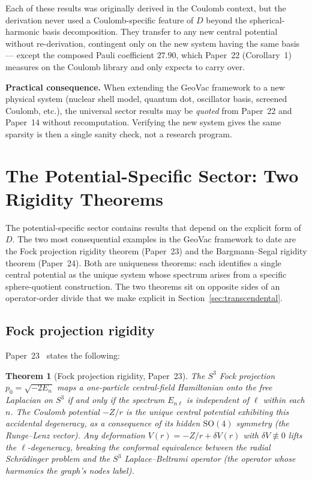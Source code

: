 \documentclass[twocolumn,pra,amsmath,amssymb,superscriptaddress]{revtex4-2}
\newtheorem{theorem}{Theorem}
\begin{document}
Each of these results was originally derived in the Coulomb context,
but the derivation never used a Coulomb-specific feature of $D$
beyond the spherical-harmonic basis decomposition.  They transfer to
any new central potential without re-derivation, contingent only on
the new system having the same basis --- except the composed Pauli
coefficient $27.90$, which Paper~22 (Corollary~1) measures on the
Coulomb library and only expects to carry over.

\medskip\noindent\textbf{Practical consequence.}  When extending the
GeoVac framework to a new physical system (nuclear shell model,
quantum dot, oscillator basis, screened Coulomb, etc.), the universal
sector results may be \emph{quoted} from Paper~22 and Paper~14
without recomputation.  Verifying the new system gives the same
sparsity is then a single sanity check, not a research program.

\section{The Potential-Specific Sector: Two Rigidity Theorems}
\label{sec:specific}

The potential-specific sector contains results that depend on the
explicit form of $D$.  The two most consequential examples in the
GeoVac framework to date are the Fock projection rigidity theorem
(Paper~23) and the Bargmann--Segal rigidity theorem (Paper~24).
Both are uniqueness theorems: each identifies a single central
potential as the unique system whose spectrum arises from a specific
sphere-quotient construction.  The two theorems sit on opposite
sides of an operator-order divide that we make explicit in
Section~\ref{sec:transcendental}.

\subsection{Fock projection rigidity}
\label{sec:fock_rigidity}

Paper~23~\cite{paper23} states the following:

\begin{theorem}[Fock projection rigidity, Paper~23]
\label{thm:fock_rigidity}
The $S^3$ Fock projection $p_0 = \sqrt{-2 E_n}$ maps a one-particle
central-field Hamiltonian onto the free Laplacian on $S^3$ if and
only if the spectrum $E_{n\ell}$ is independent of $\ell$ within
each $n$.  The Coulomb potential $-Z/r$ is the unique central
potential exhibiting this accidental degeneracy, as a consequence of
its hidden $\mathrm{SO}(4)$ symmetry (the Runge--Lenz vector).  Any
deformation $V(r) = -Z/r + \delta V(r)$ with $\delta V \not\equiv 0$
lifts the $\ell$-degeneracy, breaking the conformal equivalence
between the radial Schr\"odinger problem and the $S^3$
Laplace--Beltrami operator (the operator whose harmonics the graph's
nodes label).
\end{theorem}
\end{document}
